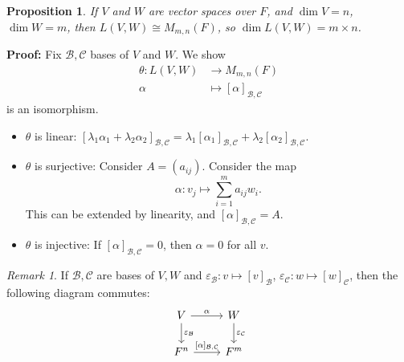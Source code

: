 \documentclass[12pt]{article}
\newtheorem{proposition}{Proposition}[section]
\theoremstyle{definition}
\theoremstyle{remark}
\newtheorem*{remark}{Remark}
\begin{document}
\begin{proposition}
If $V$ and $W$ are vector spaces over $F$, and $\dim V = n$, $\dim W = m$, then $L(V, W) \cong M_{m, n}(F)$, so $\dim L(V, W) = m \times n$.
\end{proposition}

\begin{adjustbox}{minipage = \columnwidth - 25.5pt, margin=1em, frame=1pt, margin=0em}
\textbf{Proof:} Fix $\mathcal{B}, \mathcal{C}$ bases of $V$ and $W$. We show
\begin{align*}
	\theta : L(V, W) &\to M_{m, n}(F) \\
	\alpha &\mapsto [\alpha]_{\mathcal{B}, \mathcal{C}}
\end{align*}
is an isomorphism.
\begin{itemize}
	\item $\theta$ is linear:
		$[\lambda_1 \alpha_1 + \lambda_2 \alpha_2]_{\mathcal{B}, \mathcal{C}} = \lambda_1 [\alpha_1]_{\mathcal{B}, \mathcal{C}} + \lambda_2[\alpha_2]_{\mathcal{B}, \mathcal{C}}$.
	\item $\theta$ is surjective: Consider $A = (a_{ij})$. Consider the map
		\[
		\alpha : v_j \mapsto \sum_{i = 1}^{m} a_{ij}w_i
		.\]
		This can be extended by linearity, and $[\alpha]_{\mathcal{B}, \mathcal{C}} = A$.
	\item $\theta$ is injective: If $[\alpha]_{\mathcal{B}, \mathcal{C}} = 0$, then $\alpha = 0$ for all $v$.
\end{itemize}

\end{adjustbox}

\begin{remark}
	If $\mathcal{B}, \mathcal{C}$ are bases of $V, W$ and $\varepsilon_{\mathcal{B}} : v \mapsto [v]_{\mathcal{B}}$, $\varepsilon_{\mathcal{C}} : w \mapsto [w]_{\mathcal{C}}$, then the following diagram commutes:
	\[
		\begin{tikzcd}
			V \arrow[r, "\alpha"] \arrow[d, "\varepsilon_{\mathcal{B}}"] & W \arrow[d, "\varepsilon_{\mathcal{C}}"] \\
			F^{n} \arrow[r, "{[\alpha]_{\mathcal{B},\mathcal{C}}}"] & F^{m}
		\end{tikzcd}
	\] 
\end{remark}


\newpage

\printindex
\end{document}
